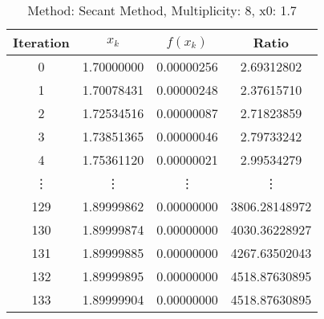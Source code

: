 \begin{table}
\centering
\caption{Method: Secant Method, Multiplicity: 8, x0: 1.7}
\label{tab:table_Secant_Method_8_1_7}
\begin{tabular}{c c c c}
\toprule
Iteration &      $x_k$ &   $f(x_k)$ &         Ratio \\
\midrule
        0 & 1.70000000 & 0.00000256 &    2.69312802 \\
        1 & 1.70078431 & 0.00000248 &    2.37615710 \\
        2 & 1.72534516 & 0.00000087 &    2.71823859 \\
        3 & 1.73851365 & 0.00000046 &    2.79733242 \\
        4 & 1.75361120 & 0.00000021 &    2.99534279 \\
   \vdots &     \vdots &     \vdots &        \vdots \\
      129 & 1.89999862 & 0.00000000 & 3806.28148972 \\
      130 & 1.89999874 & 0.00000000 & 4030.36228927 \\
      131 & 1.89999885 & 0.00000000 & 4267.63502043 \\
      132 & 1.89999895 & 0.00000000 & 4518.87630895 \\
      133 & 1.89999904 & 0.00000000 & 4518.87630895 \\
\bottomrule
\end{tabular}
\end{table}
